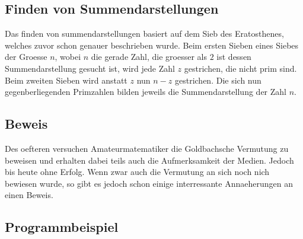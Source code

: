 \subsection{Finden von Summendarstellungen}
Das finden von summendarstellungen basiert auf dem Sieb des Eratosthenes, welches zuvor schon genauer beschrieben wurde. Beim ersten Sieben eines Siebes der Groesse $n$, wobei $n$ die gerade Zahl, die groesser als $2$ ist dessen Summendarstellung gesucht ist, wird jede Zahl $z$ gestrichen, die nicht prim sind. Beim zweiten Sieben wird anstatt $z$ nun $n - z$ gestrichen. Die sich nun gegenberliegenden Primzahlen bilden jeweils die Summendarstellung der Zahl $n$.
\subsection{Beweis}
Des oefteren versuchen Amateurmatematiker die Goldbachsche Vermutung zu beweisen und erhalten dabei teils auch die Aufmerksamkeit der Medien. Jedoch bis heute ohne Erfolg. Wenn zwar auch die Vermutung an sich noch nich bewiesen wurde, so gibt es jedoch schon einige interressante Annaeherungen an einen Beweis.
\subsection{Programmbeispiel}
